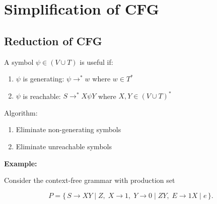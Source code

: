 \documentclass[12pt,a4paper,openany]{article}
\begin{document}
\section{Simplification of CFG}

\subsection{Reduction of CFG}

A symbol $\psi \in (V \cup T)$ is useful if:

\begin{enumerate}
    \item $\psi$ is generating: $\psi \to^* w$ where $w \in T^*$
    \item $\psi$ is reachable: $S \to^* X \psi Y$ where $X, Y \in (V \cup T)^*$
\end{enumerate}

Algorithm:

\begin{enumerate}
    \item Eliminate non-generating symbols
    \item Eliminate unreachable symbols
\end{enumerate}



\textbf{Example:}

Consider the context-free grammar with production set

\[
P = \{\, S \to XY \mid Z,\; X \to 1,\; Y \to 0 \mid ZY,\; E \to 1X \mid e \,\}.
\]
\end{document}
